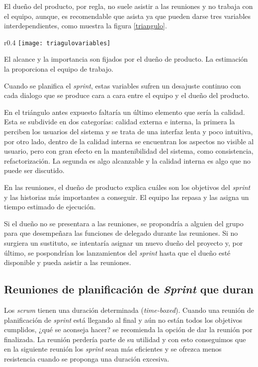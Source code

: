 El dueño del producto, por regla, no suele asistir a las reuniones y no trabaja con el equipo, aunque, es recomendable que asista ya que pueden darse tres variables interdependientes, como muestra la figura \ref{triangulo}.

\begin{wrapfigure}{r}{0.4\linewidth}
    \centering
    \texttt{[image: triagulovariables]}
    \caption{Triangulo de variables}
    \label{triangulo}
\end{wrapfigure}

El alcance y la importancia son fijados por el dueño de producto. La estimación la proporciona el equipo de trabajo.

Cuando se planifica el \textit{sprint}, estas variables sufren un desajuste continuo con cada dialogo que se produce cara a cara entre el equipo y el dueño del producto.

En el triángulo antes expuesto faltaría un último elemento que sería la calidad. Esta se subdivide en dos categorías: calidad externa e interna, la primera la perciben los usuarios del sistema y se trata de una interfaz lenta y poco intuitiva, por otro lado, dentro de la calidad interna se encuentran los aspectos no visible al usuario, pero con gran efecto en la mantenibilidad del sistema, como consistencia, refactorización. La segunda es algo alcanzable y la calidad interna es algo que no puede ser discutido.

En las reuniones, el dueño de producto explica cuáles son los objetivos del \textit{sprint} y las historias más importantes a conseguir. El equipo las repasa y las asigna un tiempo estimado de ejecución.

Si el dueño no se presentara a las reuniones, se propondría a alguien del grupo para que desempeñara las funciones de delegado durante las reuniones. Si no surgiera un sustituto, se intentaría asignar un nuevo dueño del proyecto y, por último, se pospondrían los lanzamientos del \textit{sprint} hasta que el dueño esté disponible y pueda asistir a las reuniones.

\subsection{\textbf{Reuniones de planificación de \textit{Sprint} que duran}}

Los \textit{scrum} tienen una duración determinada (\textit{time-boxed}). Cuando una reunión de planificación de \textit{sprint} está llegando al final y aún no están todos los objetivos cumplidos, ¿qué se aconseja hacer? se recomienda la opción de dar la reunión por finalizada. La reunión perdería parte de su utilidad y con esto conseguimos que en la siguiente reunión los \textit{sprint} sean más eficientes y se ofrezca menos resistencia cuando se proponga una duración excesiva.

